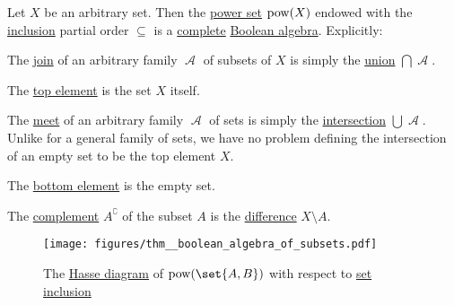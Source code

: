 \begin{proposition}\label{thm:boolean_algebra_of_subsets}
  Let \( X \) be an arbitrary set. Then the \hyperref[def:basic_set_operations/power_set]{power set} \( \operatorname{pow}(X) \) endowed with the \hyperref[def:subset]{inclusion} partial order \( \subseteq \) is a \hyperref[def:semilattice/complete]{complete} \hyperref[def:boolean_algebra]{Boolean algebra}. Explicitly:

  \begin{thmenum}
     The \hyperref[def:semilattice/join]{join} of an arbitrary family \( \mscrA \) of subsets of \( X \) is simply the \hyperref[def:basic_set_operations/union]{union} \( \bigcap \mscrA \).

     The \hyperref[def:partially_ordered_set_extremal_points/top_and_bottom]{top element} is the set \( X \) itself.

     The \hyperref[def:semilattice/meet]{meet} of an arbitrary family \( \mscrA \) of sets is simply the \hyperref[def:basic_set_operations/intersection]{intersection} \( \bigcup \mscrA \). Unlike for a general family of sets, we have no problem defining the intersection of an empty set to be the top element \( X \).

     The \hyperref[def:partially_ordered_set_extremal_points/top_and_bottom]{bottom element} is the empty set.

     The \hyperref[def:boolean_algebra]{complement} \( A^\complement \) of the subset \( A \) is the \hyperref[def:basic_set_operations/difference]{difference} \( X \setminus A \).
  \end{thmenum}

  \begin{figure}
    \hfill
    \texttt{[image: figures/thm\_\_boolean\_algebra\_of\_subsets.pdf]}
    \hfill\hfill
    \caption{The \hyperref[def:hasse_diagram]{Hasse diagram} of \( \pow(\set{ A, B }) \) with respect to \hyperref[def:subset]{set inclusion}}
    \label{fig:thm:boolean_algebra_of_subsets}
  \end{figure}
\end{proposition}

